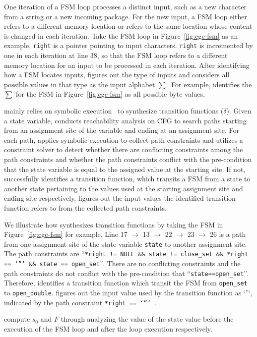 One iteration of a FSM loop processes a distinct input, 
such as a new character from a string or a new incoming package. 
For the new input, a FSM loop either refers to a different memory location 
or refers to the same location whose content is changed in each iteration.  
Take the FSM loop in Figure~\ref{fig:cgc-fsm} as an example, 
\texttt{right} is a pointer pointing to input characters.
\texttt{right} is incremented by one in each iteration at line 38, 
so that the FSM loop refers to a different memory location 
for an input to be processed in each iteration.  
After identifying how a FSM locates inputs, 
\Tool{} figures out the type of inputs and considers all possible values in that type
as the input alphabet $\sum$. For example, \Tool{} identifies 
the $\sum$ for the FSM in Figure~\ref{fig:cgc-fsm} 
as all possible byte values. 

\Tool{} mainly relies on symbolic execution~\cite{klee,s2e} 
to synthesize transition functions ($\delta$).  
Given a state variable,
\Tool{} conducts reachability analysis on CFG to search paths starting 
from an assignment site of the variable 
and ending at an assignment site. 
For each path, \Tool{} applies symbolic execution to 
collect path constraints and utilizes a constraint solver to 
detect whether there are conflicting constraints among the path constraints 
and whether the path constraints conflict with the pre-condition 
that the state variable is equal 
to the assigned value at the starting site. 
If not, \Tool{} successfully identifies a transition function, 
which transits a FSM from a state to another state pertaining to 
the values used at the starting assignment 
site and ending site respectively. 
\Tool{} figures out the input values the identified 
transition function refers to 
from the collected path constraints. 

We illustrate how \Tool{} synthesizes transition functions by taking 
the FSM in Figure~\ref{fig:cgc-fsm} for example. 
Line 17 $\rightarrow$ 13 $\rightarrow$ 22 $\rightarrow$ 23 $\rightarrow$ 26
is a path from one assignment site of the state variable \texttt{state} 
to another assignment site. 
The path constraints are ``\texttt{*right != NULL \&\& state != close\_set \&\& *right == `”’ \&\& state == open\_set}’’. 
There are no conflicting constraints and the path 
constraints do not conflict with the pre-condition that ``\texttt{state==open\_set}’’.
Therefore, \Tool{} identifies a transition function which transit the FSM from  
\texttt{open\_set} to \texttt{open\_double}. 
\Tool{} figures out the input value used by the 
transition function as `”`, 
indicated by the path constraint \texttt{*right == `”’ }.  


\Tool{} compute $s_0$ and $F$ through analyzing the value of 
the state value before the execution of the FSM loop and after the loop execution respectively. 






